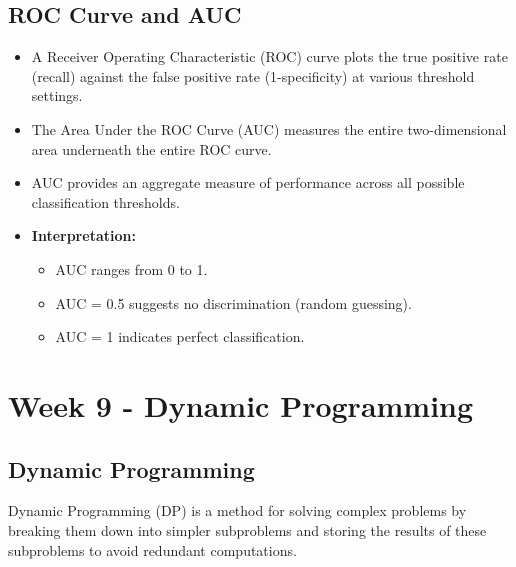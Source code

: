 \documentclass[8pt]{article}
\begin{document}
\subsection*{ROC Curve and AUC}
\begin{itemize}
    \item A Receiver Operating Characteristic (ROC) curve plots the true positive rate (recall) against the false positive rate (1-specificity) at various threshold settings.
    \item The Area Under the ROC Curve (AUC) measures the entire two-dimensional area underneath the entire ROC curve.
    \item AUC provides an aggregate measure of performance across all possible classification thresholds.
    \item \textbf{Interpretation:}
    \begin{itemize}
        \item AUC ranges from 0 to 1.
        \item AUC = 0.5 suggests no discrimination (random guessing).
        \item AUC = 1 indicates perfect classification.
    \end{itemize}
\end{itemize}

\newpage
\section{Week 9 - Dynamic Programming}
\subsection*{Dynamic Programming}
Dynamic Programming (DP) is a method for solving complex problems by breaking them down into simpler subproblems and storing the results of these subproblems to avoid redundant computations.
\end{document}
